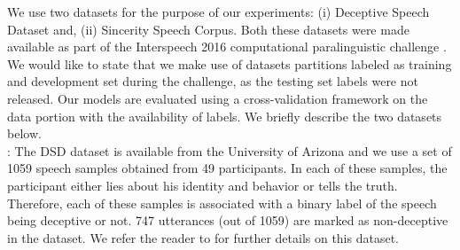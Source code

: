 \documentclass{article}
\begin{document}
\begin{spacing}{0.89}

We use two datasets for the purpose of our experiments: (i) Deceptive Speech Dataset and, (ii) Sincerity Speech Corpus.
Both these datasets were made available as part of the Interspeech 2016 computational paralinguistic challenge \cite{schuller2016interspeech}.
We would like to state that we make use of datasets partitions labeled as training and development set during the challenge, as the testing set labels were not released.
Our models are evaluated using a cross-validation framework on the data portion with the availability of labels. 
We briefly describe the two datasets below.\\ 

:
The DSD dataset is available from the University of Arizona and we use a set of 1059 speech samples obtained from 49 participants.
In each of these samples, the participant either lies about his identity and behavior or tells the truth. 
Therefore, each of these samples is associated with a binary label of the speech being deceptive or not.
747 utterances (out of 1059) are marked as non-deceptive in the dataset.
We refer the reader to \cite{schuller2016interspeech} for further details on this dataset.\\


\end{spacing}
\end{document}
